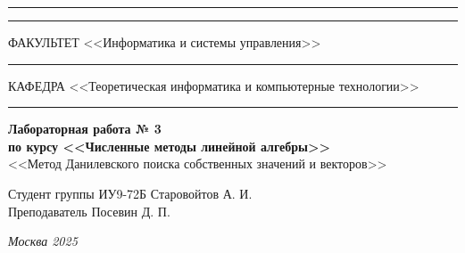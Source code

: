 \documentclass[a4paper, 14pt]{extarticle}
\begin{document}
\begin{titlepage}
\vspace{-25pt}
\hspace{-35pt}\rule{\textwidth}{2.3pt}

\vspace*{-20.3pt}
\hspace{-35pt}\rule{\textwidth}{0.4pt}

\vspace{1.5ex}
\hspace{-35pt} \noindent \small ФАКУЛЬТЕТ\hspace{80pt} <<Информатика и системы управления>>

\vspace*{-16pt}
\hspace{47pt}\rule{0.83\textwidth}{0.4pt}

\vspace{0.5ex}
\hspace{-35pt} \noindent \small КАФЕДРА\hspace{50pt} <<Теоретическая информатика и компьютерные технологии>>

\vspace*{-16pt}
\hspace{30pt}\rule{0.866\textwidth}{0.4pt}

\vspace{11em}

\begin{center}
\Large {\bf Лабораторная работа № 3} \\
\large {\bf по курсу <<Численные методы линейной алгебры>>} \\
\large <<Метод Данилевского поиска собственных значений и векторов>>

\end{center}\normalsize

\vspace{8em}


\begin{flushright}
  {Студент группы ИУ9-72Б Старовойтов А. И. \hspace*{15pt}\\
  \vspace{2ex}
  Преподаватель Посевин Д. П.\hspace*{15pt}}
\end{flushright}

\bigskip

\vfill


\begin{center}
\textsl{Москва 2025}
\end{center}
\end{titlepage}
\end{document}
